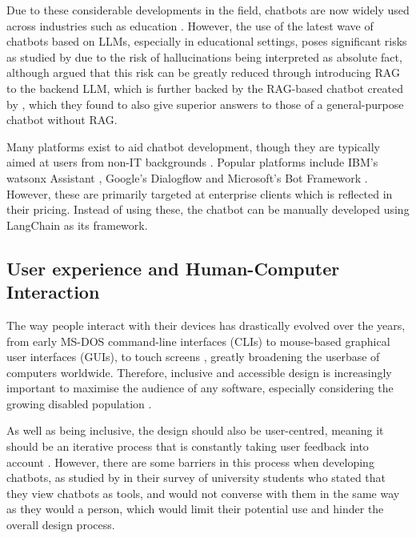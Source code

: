\documentclass[12pt]{report}
\begin{document}
    Due to these considerable developments in the field, chatbots are now widely used 
    across industries such as education \autocite{kuhail_interacting_2023}. However, the use of the latest wave of chatbots based on LLMs,
    especially in educational settings, poses significant risks as studied by \textcite{neumann_llm-driven_2024}
    due to the risk of hallucinations being interpreted as absolute fact, although \textcite{shuster_retrieval_2021} 
    argued that this risk can be greatly reduced through introducing RAG to the backend LLM, which is further backed 
    by the RAG-based chatbot created by \textcite{ge_development_2023}, which they found to also give superior answers
    to those of a general-purpose chatbot without RAG.  


    Many platforms exist to aid chatbot development, though they are typically aimed at users from non-IT backgrounds 
    \autocite{srivastava_desirable_2020}. Popular platforms include IBM's watsonx Assistant \autocite{ibm_ibm_2024},
    Google's Dialogflow \autocite{google_conversational_nodate} and Microsoft's Bot Framework \autocite{microsoft_microsoft_nodate}.
    However, these are primarily targeted at enterprise clients which is reflected in their pricing. Instead of using these,
    the chatbot can be manually developed using LangChain as its framework.

    

    \subsection{User experience and Human-Computer Interaction}

    The way people interact with their devices has drastically evolved over the years, from early MS-DOS command-line 
    interfaces (CLIs) to mouse-based graphical user interfaces (GUIs), to touch screens \autocite{kotian_systematic_2024}, greatly broadening
    the userbase of computers worldwide. Therefore, inclusive and accessible design is increasingly important to maximise the audience of any software,
    especially considering the growing disabled population \autocite{putnam_how_2012}. 
    
    As well as being inclusive, the design 
    should also be user-centred, meaning it should be an iterative process that is constantly taking user feedback 
    into account \autocite{chammas_closer_2015}. However, there are some barriers in this process when developing 
    chatbots, as studied by \textcite{clark_what_2019} in their survey of university students who stated that they view 
    chatbots as tools, and would not converse with them in the same way as they would a person, which would 
    limit their potential use and hinder the overall design process. 
\end{document}
